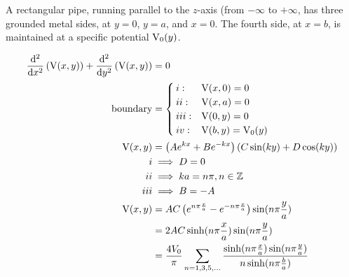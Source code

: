 \begin{hwkProblem}{3.15}{}

	A rectangular pipe, running parallel to the \( z \)-axis (from \( - \infty \) to \( + \infty \), has three grounded metal sides, at \( y = 0 \), \( y = a \), and \( x = 0 \). The fourth side, at \( x = b \), is maintained at a specific potential \( \func{V_{0}}[y] \).

	\hwkSol{}

	\begin{align*}
		\derivsec{x}{\func{V}[x, y]} + \derivsec{y}{\func{V}[x, y]} &= 0 \\
		\text{boundary} &= \begin{cases}
			i:& \func{V}[x, 0] = 0 \\
			ii:& \func{V}[x, a] = 0 \\
			iii:& \func{V}[0, y] = 0 \\
			iv:& \func{V}[b, y] = \func{V_{0}}[y]
		\end{cases} \\
		\func{V}[x, y] &= \left(A e^{kx} + B e^{-kx}\right)\left(C \sin{ky} + D \cos{ky}\right) \\
		i &\implies D = 0 \\
		ii &\implies ka = n \pi, n \in \mathbb{Z} \\
		iii &\implies B = -A \\
		\func{V}[x, y] &= AC \left(e^{n\pi \frac{x}{a}} - e^{-n \pi \frac{x}{a}}\right)\sin{n \pi \frac{y}{a}} \\
			       &= 2AC\sinh{n \pi \frac{x}{a}}\sin{n \pi \frac{y}{a}} \\
			       &= \frac{4 V_{0}}{\pi} \sum_{n=1, 3, 5, \dots} \frac{\sinh{n \pi \frac{x}{a}} \sin{n \pi \frac{y}{a}}}{n \sinh{n \pi \frac{b}{a}}} \\
	\end{align*}

\end{hwkProblem}
